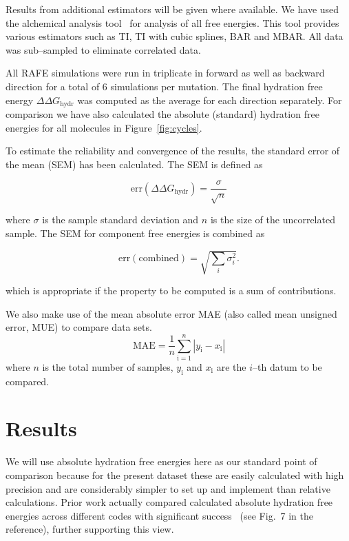 \documentclass[journal=jctcce,manuscript=article]{achemso}
\begin{document}
Results from additional estimators will be given where available.  We have used 
the alchemical analysis tool~\cite{klimovich_guidelines_2015} for analysis of 
all free energies.  This tool provides various estimators such as TI, TI with 
cubic splines, BAR and MBAR.  All data was sub--sampled to eliminate correlated 
data.

All RAFE simulations were run in triplicate in forward as well as
backward direction for a total of 6 simulations per mutation.  The
final hydration free energy $\Delta\Delta G_{\mathrm{hydr}}$ was
computed as the average for each direction separately.  For comparison we have 
also calculated the absolute (standard) hydration free energies for all
molecules in Figure~\ref{fig:cycles}.

To estimate the reliability and convergence of the results, the
standard error of the mean (SEM) has been calculated.  The SEM is
defined as

\begin{equation}
  \label{eq:sem}
  \mathrm{err}(\Delta\Delta G_{\mathrm{hydr}}) = \frac{\sigma}{\sqrt{n}}
\end{equation}

where $\sigma$ is the sample standard deviation and $n$ is the size of
the uncorrelated sample.  The SEM for component free energies is combined as

\begin{equation}
  \label{eq:sem-comb}
  \mathrm{err}(\mathrm{combined}) = \sqrt{\sum_i \sigma_i^2}.
\end{equation}

which is appropriate if the property to be computed is a sum of
contributions.

We also make use of the mean absolute error MAE (also called mean unsigned 
error, MUE) to compare data sets.
\begin{equation}
\label{eq:MUE}
\mathrm{MAE} = \frac{1}{n}\sum_\mathrm{i=1}^n \left | y_\mathrm{i} - 
x_\mathrm{i} \right |
\end{equation}
where $n$ is the total number of samples, $y_\mathrm{i}$ and $x_\mathrm{i}$ are 
the $i$--th datum to be compared.


\section{Results}
\label{sec:results}

We will use absolute hydration free energies here as our standard point of 
comparison because for the present dataset these are easily calculated with high precision \cite{doi:10.1021/acs.jced.7b00104} %
and are considerably simpler to set up and implement than relative calculations.
Prior work actually compared calculated absolute hydration free energies across 
different codes with significant success~\cite{klimovich_predicting_2010} (see 
Fig.~7 in the reference), further supporting this view.
\end{document}
